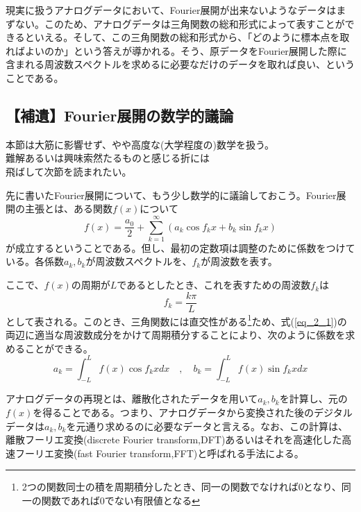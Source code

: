現実に扱うアナログデータにおいて、Fourier展開が出来ないようなデータはまずない。このため、アナログデータは三角関数の総和形式によって表すことができるといえる。そして、この三角関数の総和形式から、「どのように標本点を取ればよいのか」という答えが導かれる。そう、原データをFourier展開した際に含まれる周波数スペクトルを求めるに必要なだけのデータを取れば良い、ということである。

\subsection{【補遺】Fourier展開の数学的議論}
\begin{center}
\begin{minipage}[]{0.75\linewidth}
\begin{screen}
\begin{center}
本節は大筋に影響せず、やや高度な(大学程度の)数学を扱う。\\
難解あるいは興味索然たるものと感じる折には\\
飛ばして次節を読まれたい。
\end{center}
\end{screen}
\end{minipage}
\end{center}

先に書いたFourier展開について、もう少し数学的に議論しておこう。Fourier展開の主張とは、ある関数$f(x)$について
\begin{equation}
f(x)=\frac{a_0}{2} + \sum^{\infty}_{k=1} \left( a_k \cos f_kx + b_k \sin f_kx \right) \label{eq_2_1}
\end{equation}
が成立するということである。但し、最初の定数項は調整のために係数をつけている。各係数$a_k,b_k$が周波数スペクトルを、$f_k$が周波数を表す。

ここで、$f(x)$の周期が$L$であるとしたとき、これを表すための周波数$f_k$は
\begin{equation}
f_k=\frac{k\pi}{L}
\end{equation}
として表される。このとき、三角関数には直交性がある\footnote{2つの関数同士の積を周期積分したとき、同一の関数でなければ0となり、同一の関数であれば0でない有限値となる}ため、式(\ref{eq_2_1})の両辺に適当な周波数成分をかけて周期積分することにより、次のように係数を求めることができる。
\begin{equation}
a_k=\int^{L}_{-L} f(x) \cos f_kx dx \quad , \quad b_k=\int^{L}_{-L} f(x) \sin f_kx dx \label{eq_2_2}
\end{equation}

アナログデータの再現とは、離散化されたデータを用いて$a_k,b_k$を計算し、元の$f(x)$を得ることである。つまり、アナログデータから変換された後のデジタルデータは$a_k,b_k$を元通り求めるのに必要なデータと言える。なお、この計算は、離散フーリエ変換(discrete Fourier transform,DFT)あるいはそれを高速化した高速フーリエ変換(fast Fourier transform,FFT)と呼ばれる手法による。

